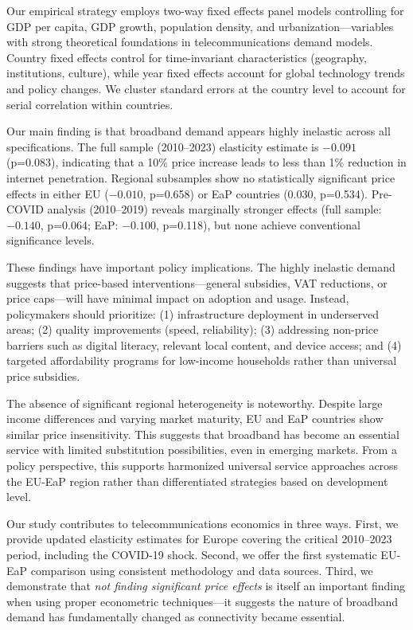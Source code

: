 \documentclass[12pt,review]{elsarticle}
\begin{document}
Our empirical strategy employs two-way fixed effects panel models controlling for GDP per capita, GDP growth, population density, and urbanization---variables with strong theoretical foundations in telecommunications demand models. Country fixed effects control for time-invariant characteristics (geography, institutions, culture), while year fixed effects account for global technology trends and policy changes. We cluster standard errors at the country level to account for serial correlation within countries.

Our main finding is that broadband demand appears highly inelastic across all specifications. The full sample (2010--2023) elasticity estimate is $-0.091$ (p=0.083), indicating that a 10\% price increase leads to less than 1\% reduction in internet penetration. Regional subsamples show no statistically significant price effects in either EU ($-0.010$, p=0.658) or EaP countries ($0.030$, p=0.534). Pre-COVID analysis (2010--2019) reveals marginally stronger effects (full sample: $-0.140$, p=0.064; EaP: $-0.100$, p=0.118), but none achieve conventional significance levels.

These findings have important policy implications. The highly inelastic demand suggests that price-based interventions---general subsidies, VAT reductions, or price caps---will have minimal impact on adoption and usage. Instead, policymakers should prioritize: (1) infrastructure deployment in underserved areas; (2) quality improvements (speed, reliability); (3) addressing non-price barriers such as digital literacy, relevant local content, and device access; and (4) targeted affordability programs for low-income households rather than universal price subsidies.

The absence of significant regional heterogeneity is noteworthy. Despite large income differences and varying market maturity, EU and EaP countries show similar price insensitivity. This suggests that broadband has become an essential service with limited substitution possibilities, even in emerging markets. From a policy perspective, this supports harmonized universal service approaches across the EU-EaP region rather than differentiated strategies based on development level.

Our study contributes to telecommunications economics in three ways. First, we provide updated elasticity estimates for Europe covering the critical 2010--2023 period, including the COVID-19 shock. Second, we offer the first systematic EU-EaP comparison using consistent methodology and data sources. Third, we demonstrate that \textit{not finding significant price effects} is itself an important finding when using proper econometric techniques---it suggests the nature of broadband demand has fundamentally changed as connectivity became essential.
\end{document}
